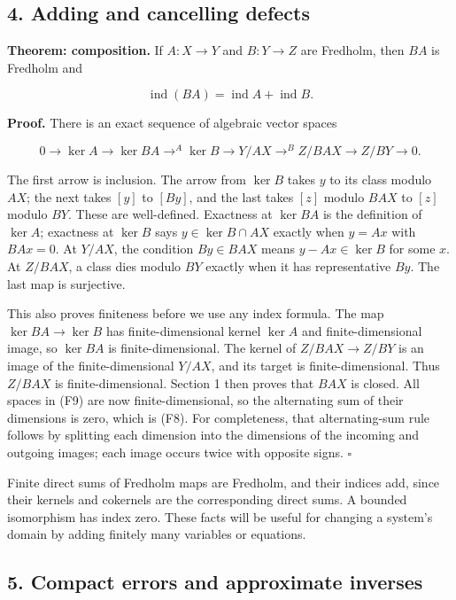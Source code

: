 \documentclass[
  11pt,
]{article}
\begin{document}
\subsection{4. Adding and cancelling
defects}\label{adding-and-cancelling-defects}

\textbf{Theorem: composition.} If \(A:X\to Y\) and \(B:Y\to Z\) are
Fredholm, then \(BA\) is Fredholm and

\[
\operatorname{ind}(BA)=\operatorname{ind}A+\operatorname{ind}B.  \tag{F8}
\]

\textbf{Proof.} There is an exact sequence of algebraic vector spaces

\[
0\longrightarrow\ker A\longrightarrow\ker BA
\mathop{\longrightarrow}^{A}\ker B
\longrightarrow Y/AX
\mathop{\longrightarrow}^{B} Z/BAX
\longrightarrow Z/BY\longrightarrow0.                         \tag{F9}
\]

The first arrow is inclusion. The arrow from \(\ker B\) takes \(y\) to
its class modulo \(AX\); the next takes \([y]\) to \([By]\), and the
last takes \([z]\) modulo \(BAX\) to \([z]\) modulo \(BY\). These are
well-defined. Exactness at \(\ker BA\) is the definition of \(\ker A\);
exactness at \(\ker B\) says \(y\in\ker B\cap AX\) exactly when \(y=Ax\)
with \(BAx=0\). At \(Y/AX\), the condition \(By\in BAX\) means
\(y-Ax\in\ker B\) for some \(x\). At \(Z/BAX\), a class dies modulo
\(BY\) exactly when it has representative \(By\). The last map is
surjective.

This also proves finiteness before we use any index formula. The map
\(\ker BA\to\ker B\) has finite-dimensional kernel \(\ker A\) and
finite-dimensional image, so \(\ker BA\) is finite-dimensional. The
kernel of \(Z/BAX\to Z/BY\) is an image of the finite-dimensional
\(Y/AX\), and its target is finite-dimensional. Thus \(Z/BAX\) is
finite-dimensional. Section 1 then proves that \(BAX\) is closed. All
spaces in (F9) are now finite-dimensional, so the alternating sum of
their dimensions is zero, which is (F8). For completeness, that
alternating-sum rule follows by splitting each dimension into the
dimensions of the incoming and outgoing images; each image occurs twice
with opposite signs. \(\square\)

Finite direct sums of Fredholm maps are Fredholm, and their indices add,
since their kernels and cokernels are the corresponding direct sums. A
bounded isomorphism has index zero. These facts will be useful for
changing a system's domain by adding finitely many variables or
equations.

\subsection{5. Compact errors and approximate
inverses}\label{compact-errors-and-approximate-inverses}
\end{document}
